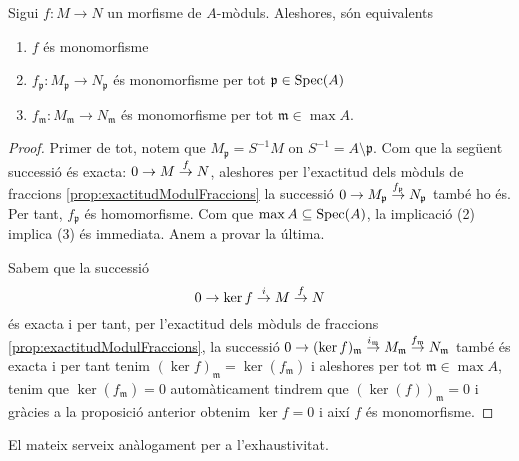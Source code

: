 \documentclass[../../../main.tex]{subfiles}
\begin{document}
\begin{coro}
\label{coro:morfismesPropietatsLocalsInjectivitat} Sigui $f:M\to N$ un morfisme de $A$-mòduls. Aleshores, són equivalents
\begin{enumerate}[(1)]
    \item $f$ és monomorfisme
    \item $f_\mathfrak{p}:M_\mathfrak{p}\to N_\mathfrak{p}$ és monomorfisme per tot $\mathfrak{p}\in\mathrm{Spec}(A)$
    \item $f_\mathfrak{m}:M_\mathfrak{m}\to N_\mathfrak{m}$ és monomorfisme per tot $\mathfrak{m}\in\max A$.
\end{enumerate}
\end{coro}
\begin{proof}
Primer de tot, notem que $M_\mathfrak{p} = S^{-1}M$ on $S^{-1} = A\setminus\mathfrak{p}$. Com que la següent successió és exacta: $0\to M\overset{f}{\to}N$, aleshores per l'exactitud dels mòduls de fraccions \ref{prop:exactitudModulFraccions} la successió $0\to M_\mathfrak{p}\overset{f_\mathfrak{p}}{\to}N_\mathfrak{p}$ també ho és. Per tant, $f_\mathfrak{p}$ és homomorfisme. Com que $\max A\subseteq\mathrm{Spec}(A)$, la implicació (2) implica (3) és immediata. Anem a provar la última.

Sabem que la successió
\begin{equation}
    \notag
    0\to \ker f\overset{i}{\to}M\overset{f}{\to}N
\end{equation}
és exacta i per tant, per l'exactitud dels mòduls de fraccions \ref{prop:exactitudModulFraccions}, la successió $0\to (\ker f)_\mathfrak{m}\overset{i_\mathfrak{m}}{\to}M_\mathfrak{m}\overset{f_\mathfrak{m}}{\to}N_\mathfrak{m}$ també és exacta i per tant tenim $(\ker f)_\mathfrak{m} = \ker(f_\mathfrak{m})$ i aleshores per tot $\mathfrak{m}\in \max A$, tenim que $\ker(f_\mathfrak{m}) = 0$ automàticament tindrem que $(\ker(f))_\mathfrak{m} = 0$ i gràcies a la proposició anterior obtenim $\ker f = 0$ i així $f$ és monomorfisme.
\end{proof}

El mateix serveix anàlogament per a l'exhaustivitat.
\end{document}

